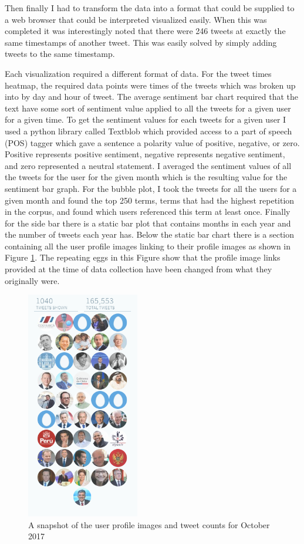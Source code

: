 \documentclass[journal]{vgtc}                %
\begin{document}
Then finally I had to transform the data into a format that could be supplied to a web browser that could be interpreted visualized easily.
When this was completed it was interestingly noted that there were 246 tweets at exactly the same timestamps of another tweet.
This was easily solved by simply adding tweets to the same timestamp. 

Each visualization required a different format of data.
For the tweet times heatmap, the required data points were times of the tweets which was broken up into by day and hour of tweet.
The average sentiment bar chart required that the text have some sort of sentiment value applied to all the tweets for a given user for a given time.
To get the sentiment values for each tweets for a given user I used a python library called Textblob \cite{tblob} which provided access to a part of speech (POS) tagger which gave a sentence a polarity value of positive, negative, or zero. Positive represents positive sentiment, negative represents negative sentiment, and zero represented a neutral statement.
I averaged the sentiment values of all the tweets for the user for the given month which is the resulting value for the sentiment bar graph.
For the bubble plot, I took the tweets for all the users for a given month and found the top 250 terms, terms that had the highest repetition in the corpus, and found which users referenced this term at least once.
Finally for the side bar there is a static bar plot that contains months in each year and the number of tweets each year has.
Below the static bar chart there is a section containing all the user profile images linking to their profile images as shown in Figure \ref{fig:users}.
The repeating eggs in this Figure show that the profile image links provided at the time of data collection have been changed from what they originally were.

\begin{figure}[tb]
 \centering %
 \includegraphics[height=10cm,width=\columnwidth, keepaspectratio]{imgs/twitter-users.png}
 \caption{A snapshot of the user profile images and tweet counts for October 2017 }
 \label{fig:users}
\end{figure}
\end{document}
